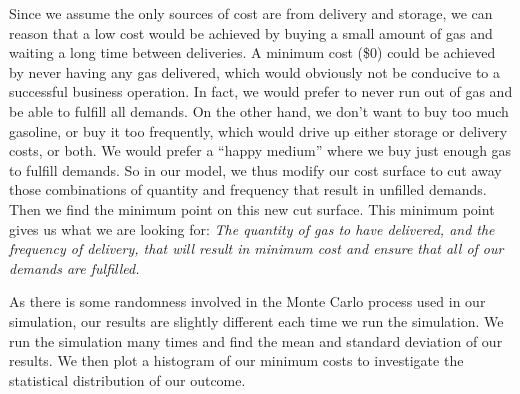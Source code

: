\documentclass{article}
\begin{document}
    Since we assume the only sources of cost are from delivery and storage, we can reason that a low cost would be achieved by buying a small amount of gas and waiting a long time between deliveries. A minimum cost (\$0) could be achieved by never having any gas delivered, which would obviously not be conducive to a successful business operation. In fact, we would prefer to never run out of gas and be able to fulfill all demands. On the other hand, we don’t want to buy too much gasoline, or buy it too frequently, which would drive up either storage or delivery costs, or both. We would prefer a “happy medium” where we buy just enough gas to fulfill demands. So in our model, we thus modify our cost surface to cut away those combinations of quantity and frequency that result in unfilled demands. Then we find the minimum point on this new cut surface. This minimum point gives us what we are looking for: \emph{The quantity of gas to have delivered, and the frequency of delivery, that will result in minimum cost and ensure that all of our demands are fulfilled.}

    As there is some randomness involved in the Monte Carlo process used in our simulation, our results are slightly different each time we run the simulation. We run the simulation many times and find the mean and standard deviation of our results. We then plot a histogram of our minimum costs to investigate the statistical distribution of our outcome.
    \pagebreak
\end{document}

